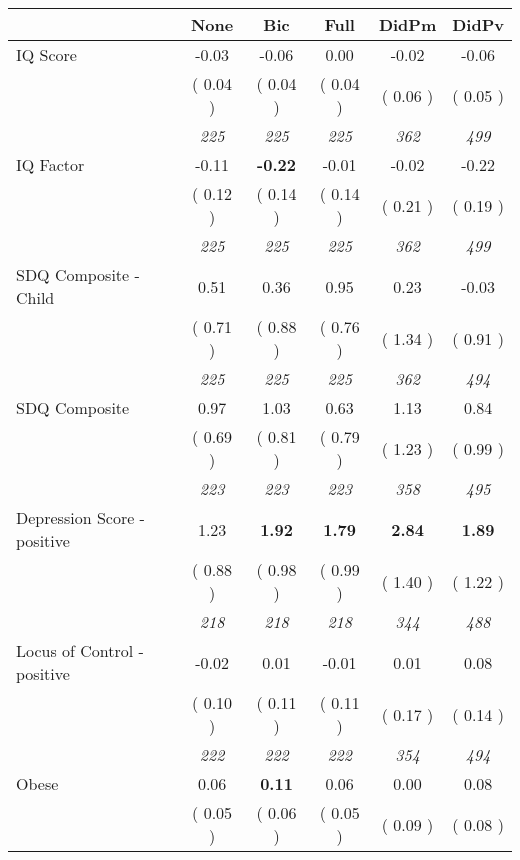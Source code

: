 \begin{tabular}{l c c c c c}
\toprule
 & None & Bic & Full & DidPm & DidPv \\
\midrule
IQ Score &     -0.03 &     -0.06 &      0.00 &     -0.02 &     -0.06 \\
& (     0.04 ) & (     0.04 ) & (     0.04 ) & (     0.06 ) & (     0.05 ) \\
& \textit{ 225 } & \textit{ 225 } & \textit{ 225 } & \textit{ 362 } & \textit{ 499 } \\
IQ Factor &     -0.11 & \textbf{     -0.22 } &     -0.01 &     -0.02 &     -0.22 \\
& (     0.12 ) & (     0.14 ) & (     0.14 ) & (     0.21 ) & (     0.19 ) \\
& \textit{ 225 } & \textit{ 225 } & \textit{ 225 } & \textit{ 362 } & \textit{ 499 } \\
SDQ Composite - Child &      0.51 &      0.36 &      0.95 &      0.23 &     -0.03 \\
& (     0.71 ) & (     0.88 ) & (     0.76 ) & (     1.34 ) & (     0.91 ) \\
& \textit{ 225 } & \textit{ 225 } & \textit{ 225 } & \textit{ 362 } & \textit{ 494 } \\
SDQ Composite &      0.97 &      1.03 &      0.63 &      1.13 &      0.84 \\
& (     0.69 ) & (     0.81 ) & (     0.79 ) & (     1.23 ) & (     0.99 ) \\
& \textit{ 223 } & \textit{ 223 } & \textit{ 223 } & \textit{ 358 } & \textit{ 495 } \\
Depression Score - positive &      1.23 & \textbf{      1.92 } & \textbf{      1.79 } & \textbf{      2.84 } & \textbf{      1.89 } \\
& (     0.88 ) & (     0.98 ) & (     0.99 ) & (     1.40 ) & (     1.22 ) \\
& \textit{ 218 } & \textit{ 218 } & \textit{ 218 } & \textit{ 344 } & \textit{ 488 } \\
Locus of Control - positive &     -0.02 &      0.01 &     -0.01 &      0.01 &      0.08 \\
& (     0.10 ) & (     0.11 ) & (     0.11 ) & (     0.17 ) & (     0.14 ) \\
& \textit{ 222 } & \textit{ 222 } & \textit{ 222 } & \textit{ 354 } & \textit{ 494 } \\
Obese &      0.06 & \textbf{      0.11 } &      0.06 &      0.00 &      0.08 \\
& (     0.05 ) & (     0.06 ) & (     0.05 ) & (     0.09 ) & (     0.08 ) \\

\end{tabular}
